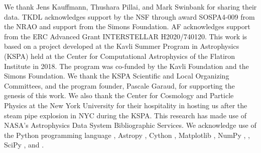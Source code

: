 \IfFileExists{emulateapjlegacy.cls}{\documentclass[iop]{emulateapjlegacy}}{\documentclass[iop]{emulateapj}}
\begin{document}
\acknowledgements

We thank Jens Kauffmann, Thushara Pillai, and Mark Swinbank for sharing their data.
%
TKDL acknowledges support by the NSF through award SOSPA4-009 from the NRAO and support from the Simons Foundation.
%
AF acknowledges support from the ERC Advanced Grant INTERSTELLAR H2020/740120.
%
This work is based on a project developed at the Kavli Summer Program in Astrophysics (KSPA) held at the Center for Computational Astrophysics of the Flatiron Institute in 2018. The program was co-funded by the Kavli Foundation and the Simons Foundation.
%
We thank the KSPA Scientific and Local Organizing Committees, and the program founder, Pascale Garaud, for supporting the genesis of this work.
%
We also thank the Center for Cosmology and Particle Physics at the New York University for their hospitality in hosting us after the steam pipe explosion in NYC during the KSPA.
%
This research has made use of NASA's Astrophysics Data System Bibliographic Services.
%
We acknowledge use of the Python programming language \citep{VanRossum1991}, Astropy \citep{astropy}, Cython \citep{behnel2010cython}, Matplotlib \citep{Hunter2007}, NumPy \citep{VanDerWalt2011},  \citep{Labadens2012}, SciPy \citep{scipyref}, and  \citep{Smith09a,Turk11a}.
%



\end{document}
